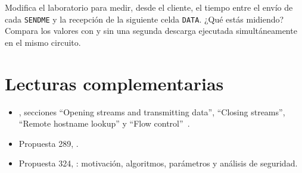 \begin{esercizio}[3]\label{es:11-rtt}
Modifica el laboratorio para medir, desde el cliente, el tiempo entre el envío de cada \texttt{SENDME} y la recepción de la siguiente celda \texttt{DATA}. ¿Qué estás midiendo? Compara los valores con y sin una segunda descarga ejecutada simultáneamente en el mismo circuito.
\end{esercizio}

\section*{Lecturas complementarias}
\begin{itemize}
  \item {}, secciones \enquote{Opening streams and transmitting data}, \enquote{Closing streams}, \enquote{Remote hostname lookup} y \enquote{Flow control}~\cite{torspec}.
  \item Propuesta 289, .
  \item Propuesta 324, : motivación, algoritmos, parámetros y análisis de seguridad.
\end{itemize}
